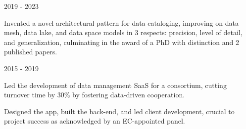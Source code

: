 \begin{cventries}
  \cventrythin
    {} %
    {2019 - 2023} %
    {
          \begin{cvitems} %
			\item {Invented a novel architectural pattern for data cataloging, improving on data mesh, data lake, and data space models in 3 respects: precision, level of detail, and generalization, culminating in the award of a PhD with distinction and 2 published papers.}
	      \end{cvitems}
    }



  \cventrythin
    {} %
    {2015 - 2019} %
    {
          \begin{cvitems} %
			\item {Led the development of data management SaaS for a consortium, cutting turnover time by 30\% by fostering data-driven cooperation.} 
			\item {Designed the app, built the back-end, and led client development, crucial to project success as acknowledged by an EC-appointed panel.}
	      \end{cvitems}
    }
    


\end{cventries}
